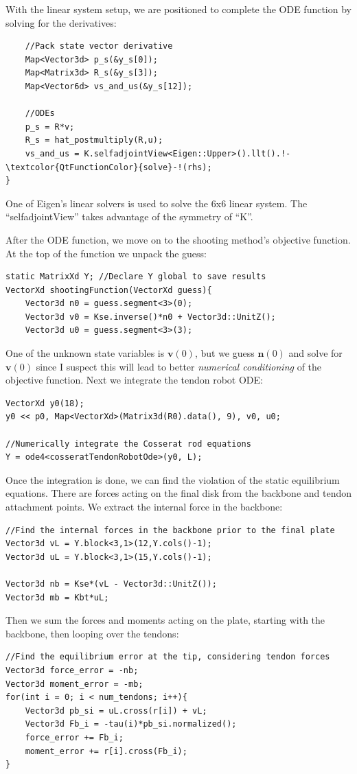 \documentclass[12pt]{article}
\begin{document}
\newpage \noindent
With the linear system setup, we are positioned to complete the ODE function by solving for the derivatives:
\begin{lstlisting}
    //Pack state vector derivative
    Map<Vector3d> p_s(&y_s[0]);
    Map<Matrix3d> R_s(&y_s[3]);
    Map<Vector6d> vs_and_us(&y_s[12]);

    //ODEs
    p_s = R*v;
    R_s = hat_postmultiply(R,u);
    vs_and_us = K.selfadjointView<Eigen::Upper>().llt().!-\textcolor{QtFunctionColor}{solve}-!(rhs);
}
\end{lstlisting}
One of Eigen's linear solvers is used to solve the 6x6 linear system. The ``selfadjointView'' takes advantage of the symmetry of ``K''.

After the ODE function, we move on to the shooting method's objective function. At the top of the function we unpack the guess:
\begin{lstlisting}
static MatrixXd Y; //Declare Y global to save results
VectorXd shootingFunction(VectorXd guess){
    Vector3d n0 = guess.segment<3>(0);
    Vector3d v0 = Kse.inverse()*n0 + Vector3d::UnitZ();
    Vector3d u0 = guess.segment<3>(3);
\end{lstlisting}
One of the unknown state variables is $\boldsymbol{v}(0)$, but we guess $\boldsymbol{n}(0)$ and solve for $\boldsymbol{v}(0)$ since I suspect this will lead to better \emph{numerical conditioning} of the objective function. Next we integrate the tendon robot ODE:
\begin{lstlisting}
VectorXd y0(18);
y0 << p0, Map<VectorXd>(Matrix3d(R0).data(), 9), v0, u0;

//Numerically integrate the Cosserat rod equations
Y = ode4<cosseratTendonRobotOde>(y0, L);
\end{lstlisting}
Once the integration is done, we can find the violation of the static equilibrium equations. There are forces acting on the final disk from the backbone and tendon attachment points. We extract the internal force in the backbone:
\begin{lstlisting}
//Find the internal forces in the backbone prior to the final plate
Vector3d vL = Y.block<3,1>(12,Y.cols()-1);
Vector3d uL = Y.block<3,1>(15,Y.cols()-1);

Vector3d nb = Kse*(vL - Vector3d::UnitZ());
Vector3d mb = Kbt*uL;
\end{lstlisting}
Then we sum the forces and moments acting on the plate, starting with the backbone, then looping over the tendons:
\begin{lstlisting}
//Find the equilibrium error at the tip, considering tendon forces
Vector3d force_error = -nb;
Vector3d moment_error = -mb;
for(int i = 0; i < num_tendons; i++){
    Vector3d pb_si = uL.cross(r[i]) + vL;
    Vector3d Fb_i = -tau(i)*pb_si.normalized();
    force_error += Fb_i;
    moment_error += r[i].cross(Fb_i);
}
\end{lstlisting}
\end{document}
